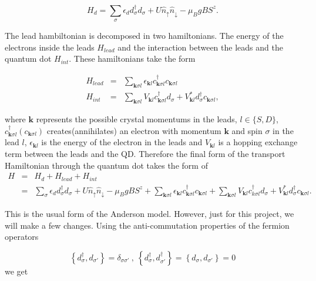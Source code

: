 \begin{equation}
    H_{d}=\sum_{\sigma}\epsilon_{d}d_{\sigma}^{\dagger}d_{\sigma}+U\hat{n}_{\uparrow}\hat{n}_{\downarrow}-\mu_{B}gBS^{z}. \label{eq:hdot}
\end{equation}





The lead hambiltonian is decomposed in two hamiltonians. The energy of the electrons inside the leads $H_{lead}$ and the interaction between the leads and the quantum dot $H_{int}$. These hamiltonians take the form 

\begin{eqnarray*}
H_{lead} & = & \sum_{\mathbf{k}\sigma l}\epsilon_{\mathbf{k}l}c_{\mathbf{k}\sigma l}^{\dagger}c_{\mathbf{k}\sigma l}\\
H_{int} & = & \sum_{\mathbf{k}\sigma l}V_{\mathbf{k}l}c_{\mathbf{k}\sigma l}^{\dagger}d_{\sigma}+V_{\mathbf{k}l}^{*}d_{\sigma}^{\dagger}c_{\mathbf{k}\sigma l},
\end{eqnarray*}


where $\mathbf{k}$ represents the possible crystal momentums in the
leads, $l\in\{S,D\}$, $c_{\mathbf{k}\sigma l}^{\dagger}(c_{\mathbf{k}\sigma l})$
creates(annihilates) an electron with momentum $\mathbf{k}$ and spin
$\sigma$ in the lead $l$, $\epsilon_{\mathbf{k}l}$ is the energy
of the electron in the leads and $V_{\mathbf{k}l}$ is a hopping exchange
term between the leads and the QD. Therefore the final form of the
transport Hamiltonian through the quantum dot takes the form of 
\begin{eqnarray}
H & = & H_{d}+H_{lead}+H_{int}\nonumber \\
 & = & \sum_{\sigma}\epsilon_{d}d_{\sigma}^{\dagger}d_{\sigma}+U\hat{n}_{\uparrow}\hat{n}_{\downarrow}-\mu_{B}gBS^{z}+\sum_{\mathbf{k}\sigma l}\epsilon_{\mathbf{k}l}c_{\mathbf{k}\sigma l}^{\dagger}c_{\mathbf{k}\sigma l}+\sum_{\mathbf{k}\sigma l}V_{\mathbf{k}l}c_{k\sigma l}^{\dagger}d_{\sigma}+V_{\mathbf{k}l}^{*}d_{\sigma}^{\dagger}c_{\mathbf{k}\sigma l}.\label{eq:Anderson}
\end{eqnarray}

This is the usual form of the Anderson model. However, just for this project, we will make a few changes. Using the anti-commutation properties of the fermion operators

\[
\left\{ d_{\sigma}^{\dagger},d_{\sigma'}\right\} =\delta_{\sigma\sigma'}\ ,\ \left\{ d_{\sigma}^{\dagger},d_{\sigma'}^{\dagger}\right\} =\left\{ d_{\sigma},d_{\sigma'}\right\} =0
\]
we get



